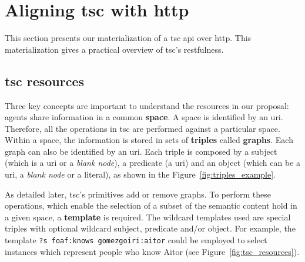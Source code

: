 \section{Aligning \acs{tsc} with \acs{http}}
\label{sec:align_tsc_http}


This section presents our materialization of a \ac{tsc} \acs{api} over \ac{http}.
This materialization gives a practical overview of \ac{tsc}'s \acs{rest}fulness.


\subsection{\acs{tsc} resources}

Three key concepts are important to understand the resources in our proposal: agents share information in a common \textbf{space}.
A space is identified by an \acs{uri}.
Therefore, all the operations in \ac{tsc} are performed against a particular space.
Within a space, the information is stored in sets of \textbf{triples} called \textbf{graphs}.
Each graph can also be identified by an \acs{uri}.
Each triple is composed by a subject (which is a \acs{uri} or a \emph{blank node}), a predicate (a \acs{uri}) and an object (which can be a \acs{uri}, a \emph{blank node} or a literal), as shown in the Figure~\ref{fig:triples_example}.

As detailed later, \ac{tsc}'s primitives add or remove graphs.
To perform these operations, which enable the selection of a subset of the semantic content hold in a given space, a \textbf{template} is required. %
The wildcard templates used are special triples with optional wildcard subject, predicate and/or object.
For example, the template \texttt{?s foaf:knows gomezgoiri:aitor} could be employed to select instances which represent people who know Aitor (see Figure~\ref{fig:tsc_resources}).

